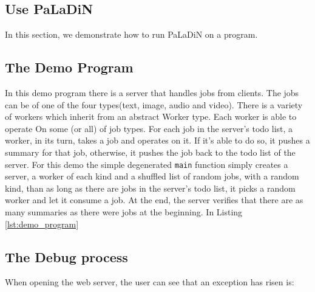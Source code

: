 \documentclass[sigconf,review]{acmart}
\begin{document}
    \subsection{Use PaLaDiN}
    In this section, we demonstrate how to run PaLaDiN on a program.

    \subsection{The Demo Program}

    In this demo program there is a server that handles jobs from clients.
    The jobs can be of one of the four types(text, image, audio and video).
    There is a variety of workers which inherit from an abstract Worker type.
    Each worker is able to operate On some (or all) of job types.
    For each job in the server’s todo list, a worker, in its turn, takes a job and operates on it.
    If it's able to do so, it pushes a summary for that job, otherwise, it pushes the job back to the todo list of the server.
    For this demo the simple degenerated \texttt{main} function simply creates a server, a worker of each kind and a shuffled list of random jobs, with a random kind, than as long as there are jobs in the server's todo list, it picks a random worker and let it consume a job.
    At the end, the server verifies that there are as many summaries as there were jobs at the beginning.
    In Listing \ref{lst:demo_program}

    \subsection{The Debug process}
    When opening the web server, the user can see that an exception has risen is:
\end{document}
